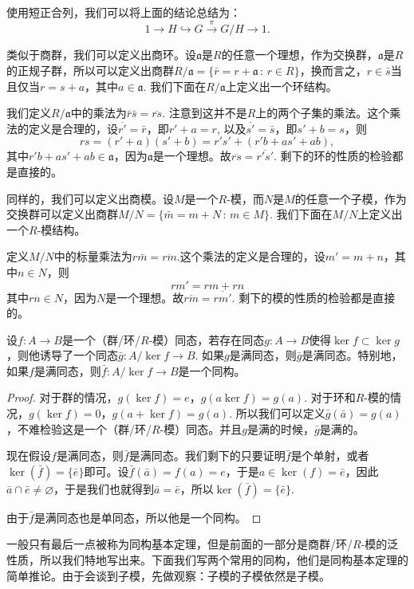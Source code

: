 使用短正合列，我们可以将上面的结论总结为：
\[
	1\to H \hookrightarrow G \xrightarrow{\pi} G/H\to 1.
\]

\para 类似于商群，我们可以定义出商环。设$\mathfrak{a}$是$R$的任意一个理想，作为交换群，$\mathfrak{a}$是$R$的正规子群，所以可以定义出商群$R/\mathfrak{a}=\{\bar{r}=r+\mathfrak{a}\,:\, r\in R\}$，换而言之，$r\in \bar{s}$当且仅当$r=s+a$，其中$a\in \mathfrak{a}$. 我们下面在$R/\mathfrak{a}$上定义出一个环结构。

我们定义$R/\mathfrak{a}$中的乘法为$\bar{r}\bar{s}=\overline{rs}$. 注意到这并不是$R$上的两个子集的乘法。这个乘法的定义是合理的，设$\overline{r'}=\bar{r}$，即$r'+a=r$, 以及$\overline{s'}=\bar{s}$，即$s'+b =s$，则
\[
	rs=(r'+a)(s'+b)=r's'+(r'b+as'+ab),
\]
其中$r'b+as'+ab\in \mathfrak{a}$，因为$\mathfrak{a}$是一个理想。故$\overline{rs}=\overline{r's'}$. 剩下的环的性质的检验都是直接的。

\para 同样的，我们可以定义出商模。设$M$是一个$R$-模，而$N$是$M$的任意一个子模，作为交换群可以定义出商群$M/N=\{\bar{m}=m+N\,:\, m\in M\}$. 我们下面在$M/N$上定义出一个$R$-模结构。

定义$M/N$中的标量乘法为$r\bar{m}=\overline{rm}$.这个乘法的定义是合理的，设$m'=m+n$，其中$n\in N$，则
\[
	rm'=rm+rn
\]
其中$rn\in N$，因为$N$是一个理想。故$\overline{rm}=\overline{rm'}$. 剩下的模的性质的检验都是直接的。

\begin{thm}[同构基本定理]
设$f:A\to B$是一个（群/环/$R$-模）同态，若存在同态$g: A\to B$使得$\ker f\subset \ker g$，则他诱导了一个同态$\bar{g}:A/\ker{f}\to B$. 如果$g$是满同态，则$\bar{g}$是满同态。特别地，如果$f$是满同态，则$\bar{f}: A/\ker{f}\to B$是一个同构。
\end{thm}

\begin{proof}
	对于群的情况，$g(\ker f)=e$，$g(a\ker f)=g(a)$. 对于环和$R$-模的情况，$g(\ker f)=0$，$g(a+\ker f)=g(a)$. 所以我们可以定义$\bar{g}(\bar{a})=g(a)$，不难检验这是一个（群/环/$R$-模）同态。并且$g$是满的时候，$\bar{g}$是满的。

	现在假设$f$是满同态，则$\bar{f}$是满同态。我们剩下的只要证明$\bar{f}$是个单射，或者$\ker(\bar{f})=\{\bar{e}\}$即可。设$\bar{f}(\bar{a})=f(a)=e$，于是$a\in \ker(f)=\bar{e}$，因此$\bar{a}\cap \bar{e}\neq\varnothing$，于是我们也就得到$\bar{a}=\bar{e}$，所以$\ker(\bar{f})=\{\bar{e}\}$. 

	由于$\bar{f}$是满同态也是单同态，所以他是一个同构。
\end{proof}

一般只有最后一点被称为同构基本定理，但是前面的一部分是商群/环/$R$-模的泛性质，所以我们特地写出来。下面我们写两个常用的同构，他们是同构基本定理的简单推论。由于会谈到子模，先做观察：子模的子模依然是子模。

